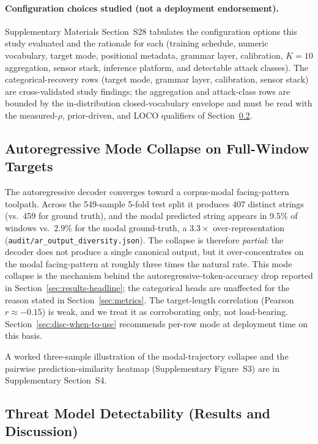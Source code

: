 \documentclass[sensors,article,submit,moreauthors,pdftex]{Definitions/mdpi}
\begin{document}
\paragraph{Configuration choices studied (not a deployment endorsement).} Supplementary Materials Section~S28 tabulates the configuration options this study evaluated and the rationale for each (training schedule, numeric vocabulary, target mode, positional metadata, grammar layer, calibration, $K\!=\!10$ aggregation, sensor stack, inference platform, and detectable attack classes). The categorical-recovery rows (target mode, grammar layer, calibration, sensor stack) are cross-validated study findings; the aggregation and attack-class rows are bounded by the in-distribution closed-vocabulary envelope and must be read with the measured-$\rho$, prior-driven, and LOCO qualifiers of Section~\ref{sec:disc-threat-model}.

\subsection{Autoregressive Mode Collapse on Full-Window Targets}
\label{sec:disc-mode-collapse}

The autoregressive decoder converges toward a corpus-modal facing-pattern toolpath. Across the 549-sample 5-fold test split it produces 407 distinct strings (vs.\ 459 for ground truth), and the modal predicted string appears in $9.5\%$ of windows vs.\ $2.9\%$ for the modal ground-truth, a $3.3\times$ over-representation (\texttt{audit/ar\_output\_diversity.json}). The collapse is therefore \emph{partial}: the decoder does not produce a single canonical output, but it over-concentrates on the modal facing-pattern at roughly three times the natural rate. This mode collapse is the mechanism behind the autoregressive-token-accuracy drop reported in Section~\ref{sec:results-headline}; the categorical heads are unaffected for the reason stated in Section~\ref{sec:metrics}. The target-length correlation (Pearson $r \approx -0.15$) is weak, and we treat it as corroborating only, not load-bearing. Section~\ref{sec:disc-when-to-use} recommends per-row mode at deployment time on this basis.

A worked three-sample illustration of the modal-trajectory collapse and the pairwise prediction-similarity heatmap (Supplementary Figure~S3) are in Supplementary Section~S4.


\subsection{Threat Model Detectability (Results and Discussion)}
\label{sec:disc-threat-model}
\end{document}

